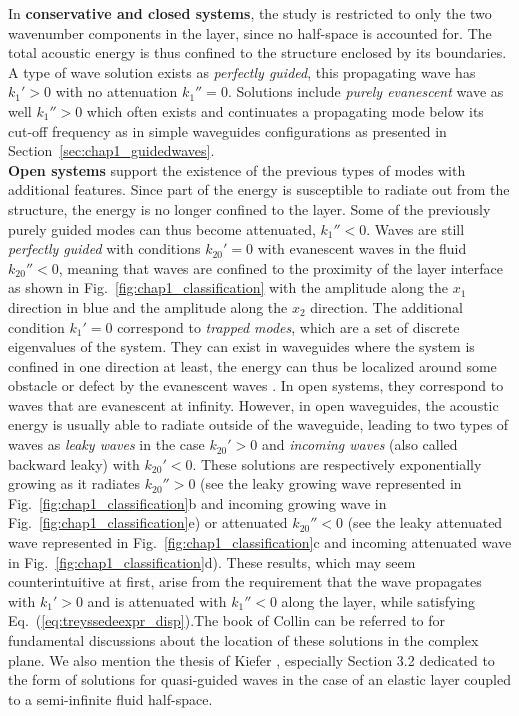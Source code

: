 In \textbf{conservative and closed systems}, the study is restricted to only the two wavenumber components in the layer, since no half-space is accounted for. The total acoustic energy is thus confined to the structure enclosed by its boundaries.  A type of wave solution exists as \textit{perfectly guided}, this propagating wave has $k_1' > 0$ with no attenuation $k_1'' = 0$. Solutions include \textit{purely evanescent} wave as well $k_1'' > 0$ which often exists and continuates a propagating mode below its cut-off frequency as in simple waveguides configurations as presented in Section~\ref{sec:chap1_guidedwaves}.\\

\textbf{Open systems} support the existence of the previous types of modes with additional features. Since part of the energy is susceptible to radiate out from the structure, the energy is no longer confined to the layer. Some of the previously purely guided modes can thus become attenuated, $k_1'' < 0$. Waves are still \textit{perfectly guided} with conditions $k_{20}' = 0$ with evanescent waves in the fluid $k_{20}'' < 0$, meaning that waves are confined to the proximity of the layer interface as shown in Fig.~\ref{fig:chap1_classification} with the amplitude along the $x_1$ direction in blue and the amplitude along the $x_2$ direction. The additional condition $k_1' = 0$ correspond to \textit{trapped modes}, which are a set of discrete eigenvalues of the system. They can exist in waveguides where the system is confined in one direction at least, the energy can thus be localized around some obstacle or defect by the evanescent waves \cite{pagneux2013, roitberg1998}. In open systems, they correspond to  waves that are evanescent at infinity. However, in open waveguides, the acoustic energy is usually able to radiate outside of the waveguide, leading to two types of waves as \textit{leaky waves} in the case $k_{20}' > 0$ and \textit{incoming waves} (also called backward leaky) with $k_{20}' < 0$. These solutions are respectively exponentially growing as it radiates $k_{20}'' > 0$ \cite{goldstone1959,monticone2015} (see the leaky growing wave represented in Fig.~\ref{fig:chap1_classification}b and incoming growing wave in Fig.~\ref{fig:chap1_classification}e) or attenuated $k_{20}'' < 0$ (see the leaky attenuated wave represented in Fig.~\ref{fig:chap1_classification}c and incoming attenuated wave in Fig.~\ref{fig:chap1_classification}d).
These results, which may seem counterintuitive at first, arise from the requirement that the wave propagates with $k_1' > 0$ and is attenuated with $k_1'' < 0$ along the layer, while satisfying Eq.~(\ref{eq:treyssedeexpr_disp}).The book of Collin \cite{collin1991} can be referred to for fundamental discussions about the location of these solutions in the complex plane. We also mention the thesis of Kiefer \cite{kiefer2022}, especially Section 3.2 dedicated to the form of solutions for quasi-guided waves in the case of an elastic layer coupled to a semi-infinite fluid half-space. \\

